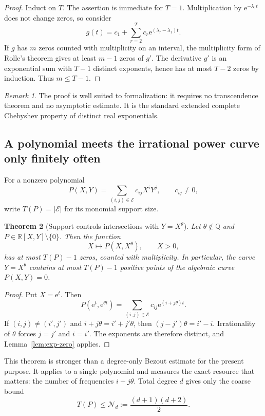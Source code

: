 \documentclass[11pt,oneside]{article}
\newtheorem{theorem}{Theorem}[section]
\theoremstyle{definition}
\theoremstyle{remark}
\newtheorem{remark}[theorem]{Remark}
\newcommand{\Q}{\mathbb Q}
\newcommand{\R}{\mathbb R}
\newcommand{\ee}{\mathrm e}
\newcommand{\tht}{\theta}
\newcommand{\Nm}{\mathcal N}
\newcommand{\cE}{\mathcal E}
\begin{document}
\begin{proof}
Induct on $T$.  The assertion is immediate for $T=1$.  Multiplication by
$\ee^{-\lambda_1t}$ does not change zeros, so consider
\[
  g(t)=c_1+\sum_{r=2}^T c_r\ee^{(\lambda_r-\lambda_1)t}.
\]
If $g$ has $m$ zeros counted with multiplicity on an interval, the multiplicity form of Rolle's
theorem gives at least $m-1$ zeros of $g'$.  The derivative $g'$ is an exponential sum with
$T-1$ distinct exponents, hence has at most $T-2$ zeros by induction.  Thus $m\le T-1$.
\end{proof}

\begin{remark}
The proof is well suited to formalization: it requires no transcendence theorem and no asymptotic
estimate.  It is the standard extended complete Chebyshev property of distinct real exponentials.
\end{remark}

\subsection{A polynomial meets the irrational power curve only finitely often}

For a nonzero polynomial
\[
  P(X,Y)=\sum_{(i,j)\in\cE}c_{ij}X^iY^j,
  \qquad c_{ij}\ne0,
\]
write $T(P)=|\cE|$ for its monomial support size.

\begin{theorem}[Support controls intersections with $Y=X^\tht$]
\label{thm:polynomial-zero-budget}
Let $\tht\notin\Q$ and $P\in\R[X,Y]\setminus\{0\}$.  Then the function
\[
  X\longmapsto P(X,X^\tht),\qquad X>0,
\]
has at most $T(P)-1$ zeros, counted with multiplicity.  In particular, the curve
$Y=X^\tht$ contains at most $T(P)-1$ positive points of the algebraic curve $P(X,Y)=0$.
\end{theorem}

\begin{proof}
Put $X=\ee^t$.  Then
\[
  P(\ee^t,\ee^{\tht t})
  =\sum_{(i,j)\in\cE}c_{ij}\ee^{(i+j\tht)t}.
\]
If $(i,j)\ne(i',j')$ and $i+j\tht=i'+j'\tht$, then
$(j-j')\tht=i'-i$.  Irrationality of $\tht$ forces $j=j'$ and $i=i'$.  The exponents are therefore
distinct, and Lemma~\ref{lem:exp-zero} applies.
\end{proof}

This theorem is stronger than a degree-only Bezout estimate for the present purpose.  It applies to
a single polynomial and measures the exact resource that matters: the number of frequencies
$i+j\tht$.  Total degree $d$ gives only the coarse bound
\begin{equation}
  T(P)\le \Nm_d:=\frac{(d+1)(d+2)}2.
  \label{eq:monomial-count}
\end{equation}
\end{document}
